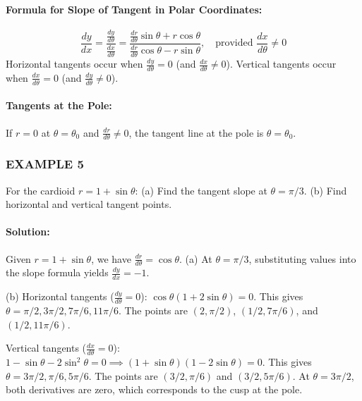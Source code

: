 \documentclass{article}
\begin{document}
\paragraph{Formula for Slope of Tangent in Polar Coordinates:}
\[
\frac{dy}{dx} = \frac{\frac{dy}{d\theta}}{\frac{dx}{d\theta}} = \frac{\frac{dr}{d\theta}\sin\theta + r\cos\theta}{\frac{dr}{d\theta}\cos\theta - r\sin\theta}, \quad \text{provided } \frac{dx}{d\theta} \neq 0
\]
Horizontal tangents occur when $\frac{dy}{d\theta} = 0$ (and $\frac{dx}{d\theta} \neq 0$). Vertical tangents occur when $\frac{dx}{d\theta} = 0$ (and $\frac{dy}{d\theta} \neq 0$).

\paragraph{Tangents at the Pole:} If $r = 0$ at $\theta = \theta_0$ and $\frac{dr}{d\theta} \neq 0$, the tangent line at the pole is $\theta = \theta_0$.

\subsubsection*{EXAMPLE 5}
For the cardioid $r = 1 + \sin\theta$: (a) Find the tangent slope at $\theta = \pi/3$. (b) Find horizontal and vertical tangent points.

\paragraph{Solution:} Given $r = 1 + \sin\theta$, we have $\frac{dr}{d\theta} = \cos\theta$.
(a) At $\theta = \pi/3$, substituting values into the slope formula yields $\frac{dy}{dx} = -1$.

(b) Horizontal tangents ($\frac{dy}{d\theta} = 0$): $\cos\theta(1 + 2\sin\theta) = 0$. This gives $\theta = \pi/2, 3\pi/2, 7\pi/6, 11\pi/6$. The points are $(2, \pi/2)$, $(1/2, 7\pi/6)$, and $(1/2, 11\pi/6)$.

Vertical tangents ($\frac{dx}{d\theta} = 0$): $1 - \sin\theta - 2\sin^2\theta = 0 \implies (1+\sin\theta)(1-2\sin\theta)=0$. This gives $\theta = 3\pi/2, \pi/6, 5\pi/6$. The points are $(3/2, \pi/6)$ and $(3/2, 5\pi/6)$. At $\theta=3\pi/2$, both derivatives are zero, which corresponds to the cusp at the pole.
\end{document}

